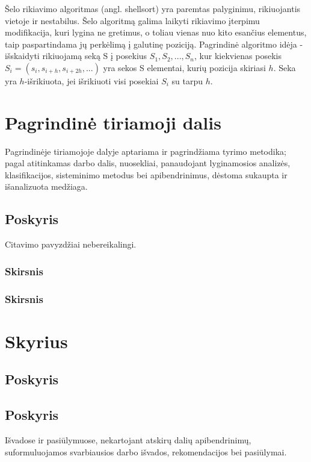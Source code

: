 \documentclass{VUMIFInfKursinis}
\begin{document}
Šelo rikiavimo algoritmas (angl. shellsort) \cite{10.1145/368370.368387} yra paremtas palyginimu, rikiuojantis vietoje ir nestabilus.
Šelo algoritmą galima laikyti rikiavimo įterpimu modifikacija,
kuri lygina ne gretimus, o toliau vienas nuo kito esančius elementus, taip paspartindama jų perkėlimą į galutinę poziciją.
Pagrindinė algoritmo idėja - išskaidyti rikiuojamą seką S į posekius $S_1, S_2, ..., S_n$,
kur kiekvienas posekis $S_i = (s_i, s_{i+h}, s_{i+2h}, ...)$ yra sekos S elementai, kurių pozicija skiriasi $h$.
Seka yra $h$-išrikiuota, jei išrikiuoti visi posekiai $S_i$ su tarpu $h$.


\section{Pagrindinė tiriamoji dalis}
Pagrindinėje tiriamojoje dalyje aptariama ir pagrindžiama tyrimo metodika;
pagal atitinkamas darbo dalis, nuosekliai, panaudojant lyginamosios analizės,
klasifikacijos, sisteminimo metodus bei apibendrinimus, dėstoma sukaupta ir
išanalizuota medžiaga.

\subsection{Poskyris}
Citavimo pavyzdžiai nebereikalingi.

\subsubsection{Skirsnis}
\subsubsection{Skirsnis}
\section{Skyrius}
\subsection{Poskyris}
\subsection{Poskyris}

Išvadose ir pasiūlymuose, nekartojant atskirų dalių apibendrinimų,
suformuluojamos svarbiausios darbo išvados, rekomendacijos bei pasiūlymai.

\printbibliography[heading=bibintoc] %
\end{document}
